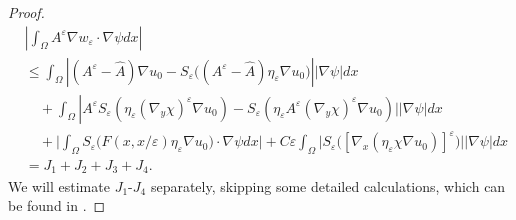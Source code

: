 \documentclass[reqno,12pt]{amsart} %
\theoremstyle{definition}
\theoremstyle{remark}
\numberwithin{equation}{section}
\newcommand{\e}{\varepsilon}
\begin{document}
\begin{proof}
    \begin{align*}
        &\left|\int_\Omega A^\varepsilon\nabla w_\varepsilon\cdot\nabla\psi dx\right|\\&\leq\int_{\Omega}|(A^{\varepsilon}-\widehat{A})\nabla u_0-S_{\varepsilon}\big((A^{\varepsilon}-\widehat{A})\eta_{\varepsilon}\nabla u_0\big)||\nabla\psi|dx\\
        &\quad + \int_{\Omega}\left|A^\varepsilon S_\varepsilon\left(\eta_\varepsilon(\nabla_y\chi)^\varepsilon\nabla u_0\right)-S_\varepsilon\left(\eta_\varepsilon A^\varepsilon(\nabla_y\chi)^\varepsilon\nabla u_0\right)||\nabla\psi|dx\right.\\
        &\quad + \bigg| \int_{\Omega} S_\varepsilon\big( F(x,x/\e) \eta_\varepsilon \nabla u_0\big) \cdot \nabla\psi dx \bigg| + C \varepsilon\int_{\Omega}\big|S_\varepsilon\big([\nabla_x(\eta_\varepsilon\chi\nabla u_0)]^\varepsilon\big)\big||\nabla\psi|dx \\
        & = J_1 + J_2 + J_3 + J_4.
    \end{align*}
    We will estimate $J_1$-$J_4$ separately, skipping some detailed calculations, which can be found in \cite[Lemma 3.2]{Niu20_reiterated}.
    

\end{proof}
\end{document}

